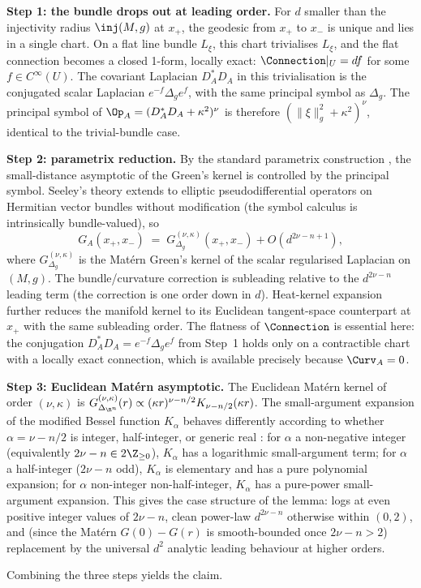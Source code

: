 \begin{proofsketch}
\textbf{Step 1: the bundle drops out at leading order.} For $d$
smaller than the injectivity radius $\inj(M,g)$ at $x_+$, the
geodesic from $x_+$ to $x_-$ is unique and lies in a single chart.
On a flat line bundle $L_\xi$, this chart trivialises $L_\xi$, and
the flat connection becomes a closed 1-form, locally exact:
$\Connection|_{U}=df$ for some $f\in C^\infty(U)$. The covariant
Laplacian $D_A^*D_A$ in this trivialisation is the conjugated scalar
Laplacian $e^{-f}\Delta_g e^f$, with the same principal symbol as
$\Delta_g$. The principal symbol of
$\Op_A=(D_A^*D_A+\kappa^2)^\nu$ is therefore $(\|\xi\|_g^2+\kappa^2)^\nu$,
identical to the trivial-bundle case.

\textbf{Step 2: parametrix reduction.} By the standard parametrix
construction \cite{Seeley1967}, the small-distance asymptotic of the
Green's kernel is controlled by the principal symbol. Seeley's
theory extends to elliptic pseudodifferential operators on Hermitian
vector bundles without modification (the symbol calculus is
intrinsically bundle-valued), so
\[
   G_A(x_+,x_-) \;=\; G_{\Delta_g}^{(\nu,\kappa)}(x_+,x_-)
   + O(d^{2\nu-n+1}),
\]
where $G_{\Delta_g}^{(\nu,\kappa)}$ is the Mat\'ern Green's kernel
of the scalar regularised Laplacian on $(M,g)$. The bundle/curvature
correction is subleading relative to the $d^{2\nu-n}$ leading term
(the correction is one order down in $d$). Heat-kernel expansion
further reduces the manifold kernel to its Euclidean tangent-space
counterpart at $x_+$ with the same subleading order. The flatness of
$\Connection$ is essential here: the conjugation
$D_A^*D_A=e^{-f}\Delta_g e^f$ from Step~1 holds only on a
contractible chart with a locally exact connection, which is
available precisely because $\Curv_A=0$.

\textbf{Step 3: Euclidean Mat\'ern asymptotic.} The Euclidean
Mat\'ern kernel of order $(\nu,\kappa)$ is
$G_{\Delta_{\R^n}}^{(\nu,\kappa)}(r)\propto(\kappa r)^{\nu-n/2}
K_{\nu-n/2}(\kappa r)$. The small-argument expansion of the modified
Bessel function $K_\alpha$ behaves differently according to whether
$\alpha=\nu-n/2$ is integer, half-integer, or generic real
\cite{Stein1999,RasmussenWilliams2006}: for $\alpha$ a non-negative
integer (equivalently $2\nu-n\in 2\Z_{\geq 0}$),
$K_\alpha$ has a logarithmic small-argument term; for $\alpha$ a
half-integer ($2\nu-n$ odd), $K_\alpha$ is elementary and has a pure
polynomial expansion; for $\alpha$ non-integer non-half-integer,
$K_\alpha$ has a pure-power small-argument expansion. This gives the
case structure of the lemma: logs at even positive integer values of
$2\nu-n$, clean power-law $d^{2\nu-n}$ otherwise within $(0,2)$,
and (since the Mat\'ern $G(0)-G(r)$ is smooth-bounded once
$2\nu-n>2$) replacement by the universal $d^2$ analytic leading
behaviour at higher orders.

Combining the three steps yields the claim.
\end{proofsketch}

